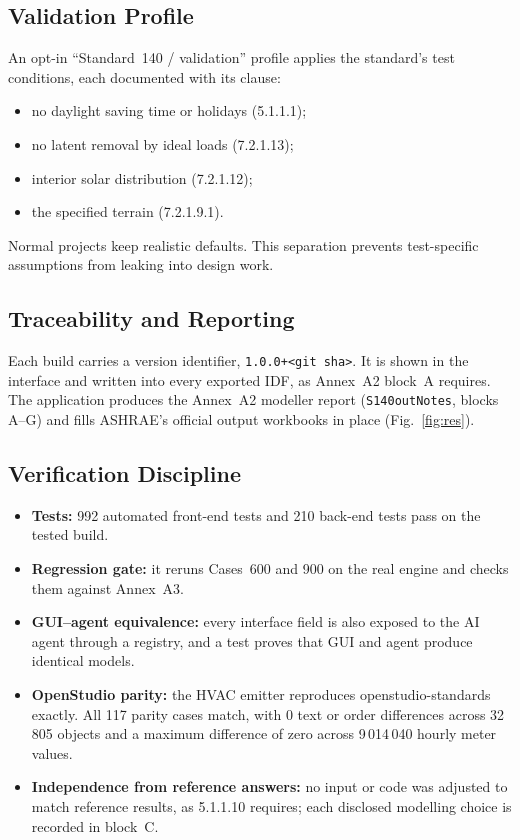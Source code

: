\documentclass[conference,10pt]{IEEEtran}
\newcommand{\code}[1]{\texttt{\footnotesize #1}}
\begin{document}
\subsection{Validation Profile}
An opt-in ``Standard~140 / validation'' profile applies the standard's test conditions, each documented with its
clause:
\begin{itemize}
\item no daylight saving time or holidays (5.1.1.1);
\item no latent removal by ideal loads (7.2.1.13);
\item interior solar distribution (7.2.1.12);
\item the specified terrain (7.2.1.9.1).
\end{itemize}
Normal projects keep realistic defaults. This separation prevents test-specific assumptions from leaking into design
work.

\subsection{Traceability and Reporting}
Each build carries a version identifier, \code{1.0.0+<git sha>}. It is shown in the interface and written into every
exported IDF, as Annex~A2 block~A requires. The application produces the Annex~A2 modeller report
(\code{S140outNotes}, blocks A--G) and fills ASHRAE's official output workbooks in place (Fig.~\ref{fig:res}).

\subsection{Verification Discipline}
\begin{itemize}
\item \textbf{Tests:} 992 automated front-end tests and 210 back-end tests pass on the tested build.
\item \textbf{Regression gate:} it reruns Cases~600 and 900 on the real engine and checks them against Annex~A3.
\item \textbf{GUI--agent equivalence:} every interface field is also exposed to the AI agent through a registry, and
a test proves that GUI and agent produce identical models.
\item \textbf{OpenStudio parity:} the HVAC emitter reproduces openstudio-standards~\cite{osstd} exactly. All 117
parity cases match, with 0 text or order differences across 32\,805 objects and a maximum difference of zero across
9\,014\,040 hourly meter values.
\item \textbf{Independence from reference answers:} no input or code was adjusted to match reference results, as
5.1.1.10 requires; each disclosed modelling choice is recorded in block~C.
\end{itemize}
\end{document}
